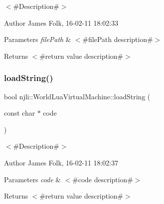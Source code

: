 $<$\#\+Description\#$>$ 

\begin{DoxyAuthor}{Author}
James Folk, 16-\/02-\/11 18\+:02\+:33
\end{DoxyAuthor}

\begin{DoxyParams}{Parameters}
{\em file\+Path} & $<$\#file\+Path description\#$>$\\
\hline
\end{DoxyParams}
\begin{DoxyReturn}{Returns}
$<$\#return value description\#$>$ 
\end{DoxyReturn}
\mbox{\label{classnjli_1_1_world_lua_virtual_machine_ab7d712b7c1b78da1f32e70791adc1ac2}} 
\subsubsection{\texorpdfstring{load\+String()}{loadString()}}
{\footnotesize\ttfamily bool njli\+::\+World\+Lua\+Virtual\+Machine\+::load\+String (\begin{DoxyParamCaption}\item[{const char $\ast$}]{code }\end{DoxyParamCaption})}



$<$\#\+Description\#$>$ 

\begin{DoxyAuthor}{Author}
James Folk, 16-\/02-\/11 18\+:02\+:37
\end{DoxyAuthor}

\begin{DoxyParams}{Parameters}
{\em code} & $<$\#code description\#$>$\\
\hline
\end{DoxyParams}
\begin{DoxyReturn}{Returns}
$<$\#return value description\#$>$ 
\end{DoxyReturn}
\mbox{\label{classnjli_1_1_world_lua_virtual_machine_abd4e5bf538e5f1a0ad8d6309b199d4a4}} 
